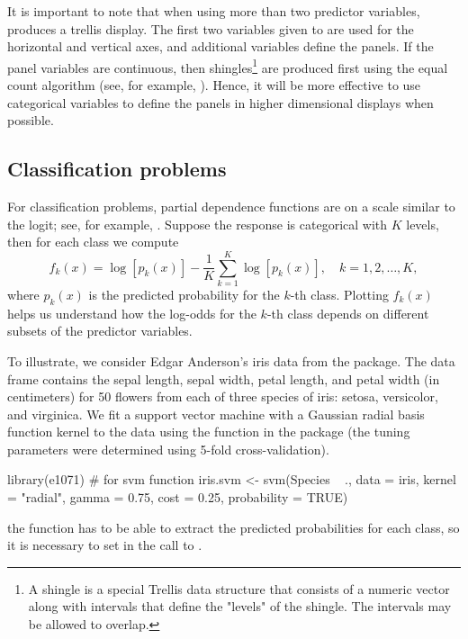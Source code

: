 It is important to note that when using more than two predictor variables,  produces a trellis display. The first two variables given to  are used for the horizontal and vertical axes, and additional variables define the panels. If the panel variables are continuous, then shingles\footnote{A shingle is a special Trellis data structure that consists of a numeric vector along with intervals that define the "levels" of the shingle. The intervals may be allowed to overlap.} are produced first using the equal count algorithm (see, for example, ). Hence, it will be more effective to use categorical variables to define the panels in higher dimensional displays when possible.


\subsection{Classification problems}
\label{sec:classification}

For classification problems, partial dependence functions are on a scale similar to the logit; see, for example, \citet[pp. 369---370]{hastie-elements-2009}. Suppose the response is categorical with $K$ levels, then for each class we compute
\begin{equation}
\label{eqn:avg-logit}
f_k(x) = \log\left[p_k(x)\right] - \frac{1}{K}\sum_{k = 1}^K\log\left[p_k(x)\right], \quad k = 1, 2, \dots, K,
\end{equation}
where $p_k(x)$ is the predicted probability for the $k$-th class. Plotting $f_k(x)$ helps us understand how the log-odds for the $k$-th class depends on different subsets of the predictor variables.

To illustrate, we consider Edgar Anderson's iris data from the  package. The  data frame contains the sepal length, sepal width, petal length, and petal width (in centimeters) for 50 flowers from each of three species of iris: setosa, versicolor, and virginica. We fit a support vector machine with a Gaussian radial basis function kernel to the data using the  function in the  package (the tuning parameters were determined using 5-fold cross-validation).
\begin{example}
library(e1071)  # for svm function
iris.svm <- svm(Species ~ ., data = iris, kernel = "radial", gamma = 0.75,
                cost = 0.25, probability = TRUE)
\end{example}
 the  function has to be able to extract the predicted probabilities for each class, so it is necessary to set  in the call to .

